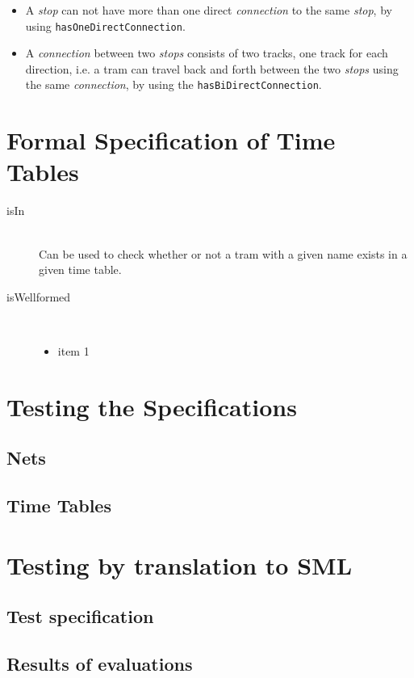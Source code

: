 \documentclass[a4]{article}
\begin{document}
\begin{description}
\begin{itemize}
            \item A \emph{stop} can not have more than one direct \emph{connection} to the same \emph{stop}, by using \verb=hasOneDirectConnection=.
            \item A \emph{connection} between two \emph{stops} consists of two tracks, one track for each direction, i.e. a tram can travel back and forth between the two \emph{stops} using the same \emph{connection}, by using the \verb=hasBiDirectConnection=.
        \end{itemize}
\end{description}

\section{Formal Specification of Time Tables}



\begin{description}
    \item[isIn] \hfill \\ Can be used to check whether or not a tram with a given name exists in a given time table.
    \item[isWellformed] \hfill \\ 
        \begin{itemize}
            \item item 1
        \end{itemize}
\end{description}

\section{Testing the Specifications}

\subsection{Nets}



\subsection{Time Tables}



\section{Testing by translation to SML}

\subsection{Test specification}

\subsection{Results of evaluations}
\end{document}
